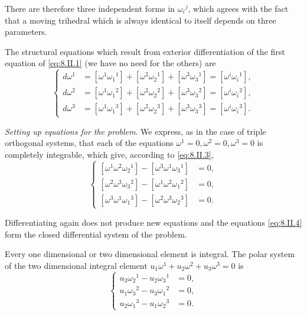 \documentclass[leqno,11pt]{book}
\numberwithin{equation}{chapter}
\theoremstyle{shape1}
\theoremstyle{shape0}
\theoremstyle{shape2}
\theoremstyle{definition}
\begin{document}
There are therefore three independent forms in $\omega_{i}{}^{j}$, which agrees with the fact that  a moving trihedral which is always identical to itself depends on three parameters.

The structural equations which result from exterior differentiation of the first equation of \eqref{eq:8.II.1} (we have no need for the others) are
\begin{equation}
  \label{eq:8.II.3}\tag{II, 3}
  \left\{
    \begin{aligned}
      d\omega^{1}&=[\omega^{1}\omega_{1}{}^{1}]+[\omega^{2}\omega_{2}{}^{1}]+[\omega^{3}\omega_{3}{}^{1}]=[\omega^{i}\omega_{i}{}^{1}],\\
      d\omega^{2}&=[\omega^{1}\omega_{1}{}^{2}]+[\omega^{2}\omega_{2}{}^{2}]+[\omega^{3}\omega_{3}{}^{2}]=[\omega^{i}\omega_{i}{}^{2}],\\
      d\omega^{3}&=[\omega^{1}\omega_{1}{}^{3}]+[\omega^{2}\omega_{2}{}^{3}]+[\omega^{3}\omega_{3}{}^{3}]=[\omega^{i}\omega_{i}{}^{3}].
    \end{aligned}
  \right.
\end{equation}

\emph{Setting up equations for the problem}. We express, as in the case of triple orthogonal systems, that each of the equations $\omega^{1}=0,\omega^{2}=0,\omega^{3}=0$ is completely integrable, which give, according to \eqref{eq:8.II.3},
\begin{equation}
  \label{eq:8.II.4}\tag{II, 4}
  \left\{
    \begin{aligned}{}
      [\omega^{1}\omega^{2}\omega_{2}{}^{1}]-[\omega^{3}\omega^{1}\omega_{3}{}^{1}]&=0,\\
      [\omega^{2}\omega^{3}\omega_{3}{}^{2}]-[\omega^{1}\omega^{2}\omega_{1}{}^{2}]&=0,\\
      [\omega^{3}\omega^{1}\omega_{1}{}^{3}]-[\omega^{2}\omega^{3}\omega_{2}{}^{3}]&=0.
    \end{aligned}
  \right.
\end{equation}

Differentiating again does not produce new equations and the equations \eqref{eq:8.II.4} form the closed differential system of the problem.

Every one dimensional or two dimensional element is integral. The polar system of the two dimensional integral element $u_{1}\omega^{1}+u_{2}\omega^{2}+u_{3}\omega^{3}=0$ is
\begin{equation}
  \label{eq:8.II.5}\tag{II, 5}
  \left\{
    \begin{aligned}
      u_{3}\omega_{2}{}^{1}-u_{2}\omega_{3}{}^{1}&=0,\\
      u_{1}\omega_{3}{}^{2}-u_{3}\omega_{1}{}^{2}&=0,\\
      u_{2}\omega_{1}{}^{3}-u_{1}\omega_{2}{}^{3}&=0.
    \end{aligned}
  \right.
\end{equation}
\end{document}
